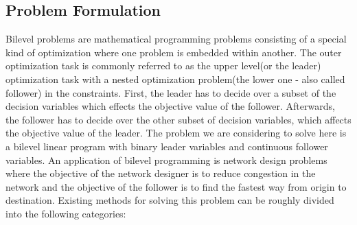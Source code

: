 \documentclass[a4paper, 12pt]{article}
\begin{document}
\subsection{Problem Formulation}
Bilevel problems are mathematical programming problems consisting of a special kind of optimization where one problem is embedded within another. The outer optimization task is commonly referred to as the upper level(or the leader) optimization task with a nested optimization problem(the lower one - also called follower) in the constraints. First, the leader has to decide over a subset of the decision variables which effects the objective value of the follower. Afterwards, the follower has to decide over the other subset of decision variables, which affects the objective value of the leader. The problem we are considering to solve here is a bilevel linear program with binary leader variables and continuous follower variables. An application of bilevel programming is network design problems where the objective of the network designer is to reduce congestion in the network and the objective of the follower is to find the fastest way from origin to destination. Existing methods for solving this problem can be roughly divided into the following categories:\par
\end{document}
